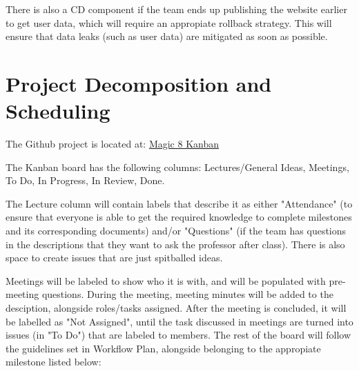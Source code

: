\documentclass{article}
\begin{document}
There is also a CD component if the team ends up publishing the website earlier to get user data, which will require an appropiate rollback strategy. This will ensure that data leaks (such as user data) are mitigated as soon as possible.

\section{Project Decomposition and Scheduling}

The Github project is located at: \href{https://github.com/users/Jacob-MB/projects/3}{Magic 8 Kanban}

The Kanban board has the following columns: Lectures/General Ideas, Meetings, To Do, In Progress, In Review, Done.

The Lecture column will contain labels that describe it as either "Attendance" (to ensure that everyone is able to get the required knowledge to complete milestones and its corresponding documents) and/or "Questions" (if the team has questions in the descriptions that they want to ask the professor after class). 
There is also space to create issues that are just spitballed ideas.

Meetings will be labeled to show who it is with, and will be populated with pre-meeting questions. During the meeting, meeting minutes will be added to the desciption, alongside roles/tasks assigned. After the meeting is concluded, it will be labelled as "Not Assigned", until the task discussed in meetings are turned into issues (in "To Do") that are labeled to members.
The rest of the board will follow the guidelines set in Workflow Plan, alongside belonging to the appropiate milestone listed below:
\end{document}
